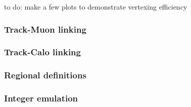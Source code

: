 {\color{red} to do: make a few plots to demonstrate vertexing efficiency}

\subsubsection{Track-Muon linking}
\subsubsection{Track-Calo linking}
\subsubsection{Regional definitions}
\subsubsection{Integer emulation}